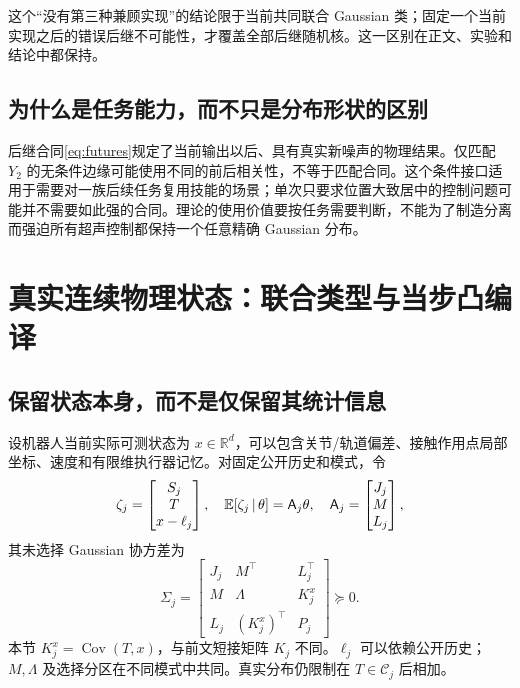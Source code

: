 \documentclass[UTF8,fontset=fandol,11pt,a4paper]{ctexart}
\newcommand{\R}{\mathbb R}\newcommand{\N}{\mathcal N}\newcommand{\E}{\mathbb E}
\DeclareMathOperator{\Cov}{Cov}\DeclareMathOperator{\im}{im}\DeclareMathOperator{\rank}{rank}
\theoremstyle{definition}\newtheorem{definition}[theorem]{定义}\newtheorem{assumption}[theorem]{条件}
\numberwithin{equation}{section}
\begin{document}
这个“没有第三种兼顾实现”的结论限于当前共同联合 Gaussian 类；固定一个当前实现之后的错误后继不可能性，才覆盖全部后继随机核。这一区别在正文、实验和结论中都保持。

\subsection{为什么是任务能力，而不只是分布形状的区别}
后继合同\eqref{eq:futures}规定了当前输出以后、具有真实新噪声的物理结果。仅匹配 $Y_2$ 的无条件边缘可能使用不同的前后相关性，不等于匹配合同。这个条件接口适用于需要对一族后续任务复用技能的场景；单次只要求位置大致居中的控制问题可能并不需要如此强的合同。理论的使用价值要按任务需要判断，不能为了制造分离而强迫所有超声控制都保持一个任意精确 Gaussian 分布。

\section{真实连续物理状态：联合类型与当步凸编译}
\label{sec:state}
\subsection{保留状态本身，而不是仅保留其统计信息}
设机器人当前实际可测状态为 $x\in\R^d$，可以包含关节/轨道偏差、接触作用点局部坐标、速度和有限维执行器记忆。对固定公开历史和模式，令
\begin{equation}
\zeta_j=\begin{bmatrix}S_j\\T\\x-\ell_j\end{bmatrix},\quad
\E[\zeta_j\given\theta]=\mathsf A_j\theta,
\quad\mathsf A_j=\begin{bmatrix}J_j\\M\\L_j\end{bmatrix},
\label{eq:statezeta}
\end{equation}
其未选择 Gaussian 协方差为
\begin{equation}
\Sigma_j=
\begin{bmatrix}
J_j&M^\top&L_j^\top\\
M&\Lambda&K_j^x\\
L_j&(K_j^x)^\top&P_j
\end{bmatrix}\succeq0.
\label{eq:statecov}
\end{equation}
本节 $K_j^x=\Cov(T,x)$，与前文短接矩阵 $K_j$ 不同。$\ell_j$ 可以依赖公开历史；$M,\Lambda$ 及选择分区在不同模式中共同。真实分布仍限制在 $T\in\mathcal C_j$ 后相加。
\end{document}
